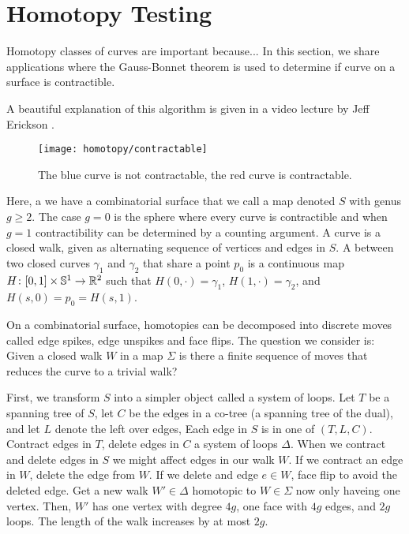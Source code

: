\section{Homotopy Testing}
\label{sec:homotopy}

Homotopy classes of curves are important  because...
In this section, we share applications
where the Gauss-Bonnet theorem is used to determine
if curve on a surface is contractible.



A beautiful explanation of this algorithm is given in a video lecture 
by Jeff Erickson \cite{erickson-lecture}.

\begin{figure}[htb]
\centering
\texttt{[image: homotopy/contractable]}
\caption{The blue curve is not contractable, the red curve is contractable.}
\label{fig:contractable}
\end{figure}

Here, a we have a combinatorial surface that we call a map denoted $S$
with genus $g\geq 2.$ The case $g=0$ is the sphere where every curve
is contractible and when $g=1$ contractibility can be determined by a counting
argument.
A curve is a closed walk, given as alternating sequence of vertices
and edges in $S$.
A  between two closed curves $\gamma_1$ and $\gamma_2$ that 
share a point $p_0$ is a continuous map $H\colon [0,1]\times \mathbb{S}^1 \to \mathbb{R}^2$ 
such that $H(0,\cdot)=\gamma_1$, $H(1,\cdot)=\gamma_2$, and $H(s,0)=p_0=H(s,1)$.

On a combinatorial surface, homotopies can be decomposed
into discrete moves called edge spikes, edge unspikes  and face flips.
The question we consider is: Given a closed walk $W$ in a map $\Sigma$ is there a finite
sequence of moves that reduces the curve to a trivial walk?


First, we transform $S$ into a simpler object called a system of loops.  
Let $T$ be a spanning tree of $S$, let $C$ be the edges in a co-tree
(a spanning tree of the dual), and let $L$ denote the left over edges,
Each edge in $S$ is in one of $(T,L,C)$.
Contract edges in $T$, delete edges in $C$ a system of loops $\Delta$.
When we contract and delete edges in $S$ we might affect edges in our walk $W$.
If we contract an edge in $W$, delete the edge from $W$.
If we delete and edge $e\in W$, face flip to avoid the deleted edge.
Get a new walk $W' \in \Delta$ homotopic to $W\in \Sigma$
now only haveing one vertex. Then, $W'$ has one vertex
with degree $4g$, one face with $4g$ edges, and $2g$ loops.
The length of the walk increases by at most $2g$.


